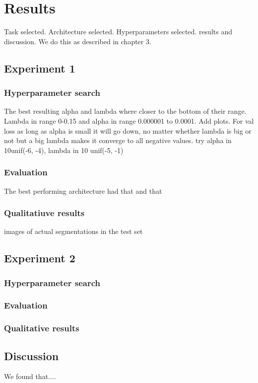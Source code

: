 \chapter{Results}
\label{ch:results}
	Task selected. Architecture selected. Hyperparameters selected. results and discussion.
We do this as described in chapter 3.

\section{Experiment 1}

\subsection{Hyperparameter search}
The best resulting alpha and lambda where closer to the bottom of their range. Lambda in range 0-0.15 and alpha in range 0.000001 to 0.0001. Add plots.
For val loss as long as alpha is small it will go down, no matter whether lambda is big or not but a big lambda makes it converge to all negative values.
try alpha in 10unif(-6, -4), lambda in 10 unif(-5, -1)

\subsection{Evaluation}
The best performing architecture had that and that

\subsection{Qualitatiuve results}
images of actual segmentations in the test set

\section{Experiment 2}
\subsection{Hyperparameter search}
\subsection{Evaluation}
\subsection{Qualitative results}


\section{Discussion}
We found that....

